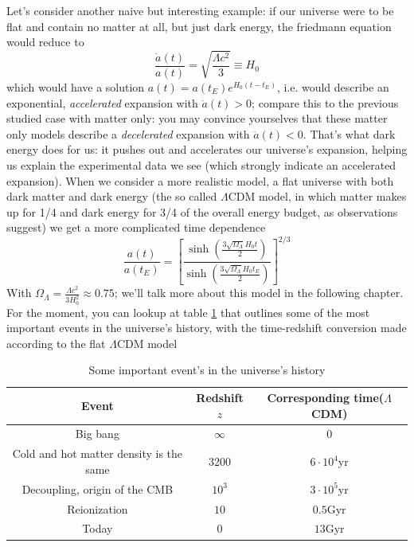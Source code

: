 Let's consider another naive but interesting example: if our universe were to be flat and contain no matter at all, but just dark energy, the friedmann equation would reduce to
\begin{equation}
\frac{\dot{a}(t)}{a(t)}=\sqrt{\frac{\Lambda c^2}{3}}\equiv H_0
\end{equation}
which would have a solution $a(t)=a(t_E)e^{H_0(t-t_E)}$, i.e. would describe an exponential, \textit{accelerated} expansion with $\ddot{a}(t)>0$; compare this to the previous studied case with matter only: you may convince yourselves that these matter only models describe a \textit{decelerated} expansion with $\ddot{a}(t)<0$. That's what dark energy does for us: it pushes out and accelerates our universe's expansion, helping us explain the experimental data we see (which strongly indicate an accelerated expansion). When we consider a more realistic model, a flat universe with both dark matter and dark energy (the so called $\Lambda$CDM model, in which matter makes up for 1/4 and dark energy for 3/4 of the overall energy budget, as observations suggest) we get a more complicated time dependence 
\begin{equation}
\frac{a(t)}{a(t_E)}=\left[\frac{\sinh{\left(\frac{3\sqrt{\Omega_\Lambda}H_0 t}{2}\right)}}{\sinh{\left(\frac{3\sqrt{\Omega_\Lambda}H_0 t_E}{2}\right)}}\right]^{2/3}
\end{equation}
With $\Omega_\Lambda=\frac{\Lambda c^2}{3H_0^2}\approx 0.75$; we'll talk more about this model in the following chapter. For the moment, you can lookup at table \ref{timez} that outlines some of the most important events in the universe's history, with the time-redshift conversion made according to the flat $\Lambda$CDM model

\begin{table}[htbp]
\begin{center}
\begin{tabular}{|c|c|c|} \hline
\textbf{Event} & \textbf{Redshift}$z$ & \textbf{Corresponding time}($\Lambda$CDM) \\ \hline
Big bang & $\infty$ & 0 \\ \hline
Cold and hot matter density is the same & 3200 & $6\cdot 10^4$yr \\ \hline
Decoupling, origin of the CMB & $10^3$ & $3\cdot 10^5$yr \\ \hline
Reionization & $10$ & $0.5$Gyr \\ \hline
Today& 0 & $13$Gyr \\ \hline
\end{tabular}
\end{center}
\caption{Some important event's in the universe's history}
\label{timez}
\end{table}
